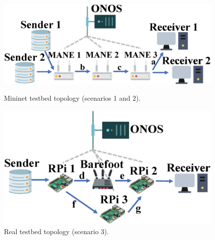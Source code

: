 	\begin{figure}[tbh]
		\centering
		\begin{minipage}[t]{0.24\textwidth}
		\centering
		\includegraphics[width=\textwidth]{fig/scenario_2.eps}
		\caption{Mininet testbed topology (scenarios 1 and 2).}
		\label{scenario_2} 
		\end{minipage}
		\hfill\begin{minipage}[t]{0.23\textwidth}
		\centering
		\includegraphics[width=\textwidth]{fig/scenario_3.eps}
		\caption{Real testbed topology (scenario 3).}
		\label{scenario_3} 
		\end{minipage}
\vspace{-0.1cm}
	\end{figure}

